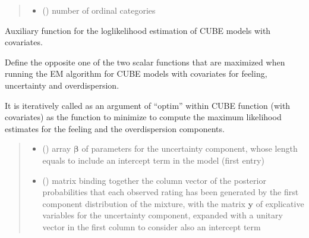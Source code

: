 \documentclass[letterpaper,10pt,english]{sphinxmanual}
\begin{document}
\begin{fulllineitems}
\begin{quote}
\begin{description}
\begin{itemize}
\item {} 
\sphinxAtStartPar
{} () \textendash{} number of ordinal categories

\end{itemize}

\end{description}\end{quote}

\end{fulllineitems}


\begin{fulllineitems}
\label{\detokenize{cubmods:cubmods.cube_ywz.Quno}}
\pysigstartsignatures
{}
\pysigstopsignatures
\sphinxAtStartPar
Auxiliary function for the log\sphinxhyphen{}likelihood estimation of CUBE models with covariates.

\sphinxAtStartPar
Define the opposite one of the two scalar functions that are maximized when running the E\sphinxhyphen{}M algorithm
for CUBE models with covariates for feeling, uncertainty and overdispersion.

\sphinxAtStartPar
It is iteratively called as an argument of “optim” within CUBE function (with covariates) as  the function
to minimize to compute the maximum likelihood estimates for the feeling and the overdispersion components.
\begin{quote}\begin{description}
\begin{itemize}
\item {} 
\sphinxAtStartPar
{} () \textendash{} array \(\pmb \beta\) of parameters for the uncertainty component, whose length equals 
 to include an intercept term in the model (first entry)

\item {} 
\sphinxAtStartPar
{} () \textendash{} matrix binding together the column vector of the posterior probabilities
that each observed rating has been generated by the first component distribution of the mixture, with the matrix 
\(\pmb y\) of explicative  variables for the uncertainty component, expanded with a unitary vector in the first column to 
consider also an intercept term


\end{itemize}
\end{description}
\end{quote}
\end{fulllineitems}
\end{document}
